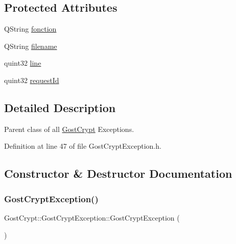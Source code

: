 \subsection*{Protected Attributes}
\begin{DoxyCompactItemize}
\item 
Q\+String \hyperlink{class_gost_crypt_1_1_gost_crypt_exception_a29b8c93d5efbb1ff369107385725a939}{fonction}
\item 
Q\+String \hyperlink{class_gost_crypt_1_1_gost_crypt_exception_a749a12375f4ba9d502623b99d8252f38}{filename}
\item 
quint32 \hyperlink{class_gost_crypt_1_1_gost_crypt_exception_abf506d911f12a4e969eea500f90bd32c}{line}
\item 
quint32 \hyperlink{class_gost_crypt_1_1_gost_crypt_exception_a7b4217ceb60c944a1ea2d38cd1ecacd0}{request\+Id}
\end{DoxyCompactItemize}


\subsection{Detailed Description}
Parent class of all \hyperlink{namespace_gost_crypt}{Gost\+Crypt} Exceptions. 

Definition at line 47 of file Gost\+Crypt\+Exception.\+h.



\subsection{Constructor \& Destructor Documentation}
\mbox{\label{class_gost_crypt_1_1_gost_crypt_exception_aaa8c5c0708b30d7ba1a7ab91a1276440}} 
\subsubsection{\texorpdfstring{Gost\+Crypt\+Exception()}{GostCryptException()}\hspace{0.1cm}{\footnotesize\ttfamily [1/3]}}
{\footnotesize\ttfamily Gost\+Crypt\+::\+Gost\+Crypt\+Exception\+::\+Gost\+Crypt\+Exception (\begin{DoxyParamCaption}{ }\end{DoxyParamCaption})\hspace{0.3cm}{\ttfamily [inline]}}



